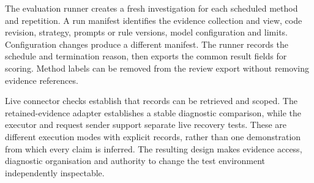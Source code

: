 The evaluation runner creates a fresh investigation for each scheduled
method and repetition. A run manifest identifies the evidence collection
and view, code revision, strategy, prompts or rule versions, model
configuration and limits. Configuration changes produce a different
manifest. The runner records the schedule and termination reason, then
exports the common result fields for scoring. Method labels can be
removed from the review export without removing evidence references.

Live connector checks establish that records can be retrieved and scoped.
The retained-evidence adapter establishes a stable diagnostic comparison,
while the executor and request sender support separate live recovery
tests. These are different execution modes with explicit records, rather
than one demonstration from which every claim is inferred. The resulting
design makes evidence access, diagnostic organisation and authority to
change the test environment independently inspectable.

